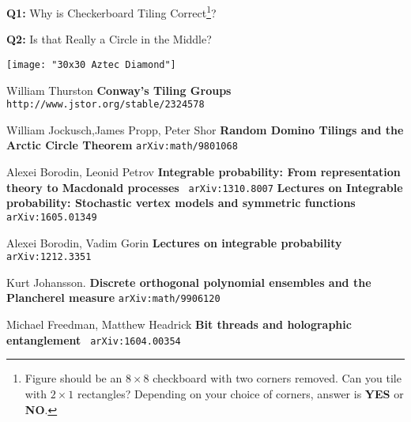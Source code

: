 \documentclass[12pt]{article}
\begin{document}
\newpage

\noindent \textbf{Q1:} Why is Checkerboard Tiling Correct\footnote{Figure should be an $8 \times 8$ checkboard with two corners removed.  Can you tile with $2 \times 1$ rectangles?  Depending on your choice of corners, answer is \textbf{YES} or \textbf{NO}.}?

\newpage

\noindent \textbf{Q2:} Is that Really a Circle in the Middle?

\texttt{[image: "30x30 Aztec Diamond"]}

\newpage


\selectfont \fontsize{12}{10}\selectfont

\begin{thebibliography}{}

\item William Thurston \textbf{Conway's Tiling Groups} \texttt{ http://www.jstor.org/stable/2324578}

\item William Jockusch,James Propp, Peter Shor \textbf{Random Domino Tilings and the Arctic Circle Theorem} \texttt{arXiv:math/9801068}


\item Alexei Borodin, Leonid Petrov \newline
 \textbf{Integrable probability: From representation theory to Macdonald processes} \hspace{4em}\;
\texttt{ arXiv:1310.8007}  \newline
\textbf{Lectures on Integrable probability: Stochastic vertex models and symmetric functions}\texttt{  arXiv:1605.01349}

\item Alexei Borodin, Vadim Gorin \textbf{Lectures on integrable probability} \texttt{arXiv:1212.3351}

\item Kurt Johansson.  \textbf{Discrete orthogonal polynomial ensembles and the Plancherel measure} \texttt{arXiv:math/9906120}

\item Michael Freedman, Matthew Headrick \textbf{Bit threads and holographic entanglement} \texttt{ arXiv:1604.00354}
\end{thebibliography}
\end{document}
